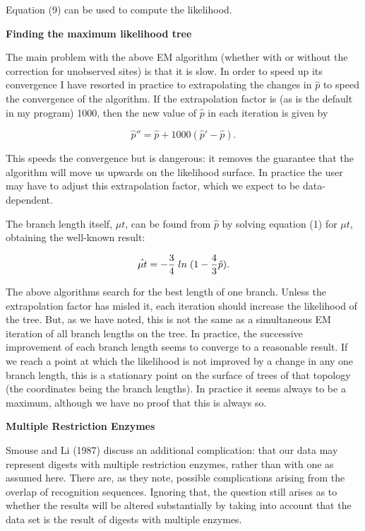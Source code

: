 Equation (9) can be used to compute the likelihood.
\bigskip

\centerline{\bf Finding the maximum likelihood tree}

The main problem with the above EM algorithm (whether with or without
the correction for unobserved sites) is that it is slow.  In order to
speed up its convergence I have resorted in practice to extrapolating the
changes in $\hat p$ to speed the convergence of the algorithm.  If the
extrapolation factor is (as is the default in my program) 1000, then the new
value of $\hat p$ in each iteration is given by

\begin{equation} %
   {\hat p}''  =  {\hat p} + 1000 ({\hat p}' - {\hat p}).
\end{equation}

This speeds the convergence but is dangerous: it removes the guarantee that
the algorithm will move us upwards on the likelihood surface.  In practice
the user may have to adjust this extrapolation factor, which we expect to be
data-dependent.

The branch length itself, $\mu t$, can be found from $\hat p$ by solving
equation (1) for $\mu t$, obtaining the well-known result:

\begin{equation} %
    {\hat {\mu t} }  =  - {3 \over 4} \;ln\;(1 - {4 \over 3} {\hat p}).
\end{equation} 

The above algorithms search for the best length of one branch.  Unless the
extrapolation factor has misled it, each iteration should increase the
likelihood of the tree.  But, as we have noted, this is not the same as a
simultaneous EM iteration of all branch lengths on the tree.  In practice,
the successive improvement of each branch length seems to converge to a
reasonable result.  If we reach a point at which the likelihood is not
improved by a change in any one branch length, this is a stationary point
on the surface of trees of that topology (the coordinates being the branch
lengths).  In practice it seems always to be a maximum, although we have no
proof that this is always so.
\bigskip

\centerline{\bf Multiple Restriction Enzymes}

Smouse and Li (1987) discuss an additional complication: that our data may
represent digests with multiple restriction enzymes, rather than with one
as assumed here.  There are, as they note, possible complications arising from
the overlap of recognition sequences.  Ignoring that, the question still
arises as to whether the results will be altered substantially by taking into
account that the data set is the result of digests with multiple enzymes.

